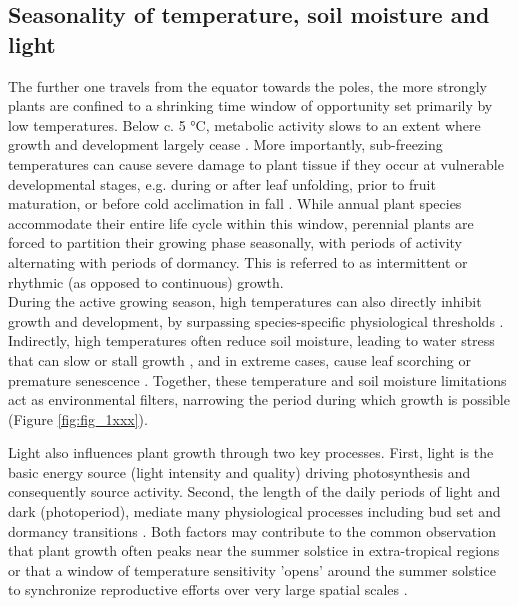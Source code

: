 \documentclass{article}
\begin{document}
	\subsection*{Seasonality of temperature, soil moisture and light}
		The further one travels from the equator towards the poles, the more strongly plants are confined to a shrinking time window of opportunity set primarily by low temperatures. Below c. 5 °C, metabolic activity slows to an extent where growth and development largely cease \citep{schenkerPhysiologicalMinimumTemperatures2014, rossiCriticalTemperaturesXylogenesis2008, kornerWinterCropGrowth2008}. More importantly, sub-freezing temperatures can cause severe damage to plant tissue if they occur at vulnerable developmental stages, e.g. during or after leaf unfolding, prior to fruit maturation, or before cold acclimation in fall \citep{sakaiFreezingInjuriesPlants1987c, baumgartenNoRiskNo2023a}. 
		While annual plant species accommodate their entire life cycle within this window, perennial plants are forced to partition their growing phase seasonally, with periods of activity alternating with periods of dormancy. This is referred to as intermittent or rhythmic (as opposed to continuous) growth. \\

		During the active growing season, high temperatures can also directly inhibit growth and development, by surpassing species-specific physiological thresholds \citep{osullivanThermalLimitsLeaf2017}. Indirectly, high temperatures often reduce soil moisture, leading to water stress that can slow or stall growth \citep{hsiaoPlantResponsesWater1973, pugnaireConstraintsWaterStress1999, etzoldNumberGrowthDays2021}, and in extreme cases, cause leaf scorching or premature senescence \citep{estiarteAlterationPhenologyLeaf2015a}. Together, these temperature and soil moisture limitations act as environmental filters, narrowing the period during which growth is possible (Figure \ref{fig:fig_1xxx}). 
		
		Light also influences plant growth through two key processes. First, light is the basic energy source (light intensity and quality) driving photosynthesis and consequently source activity. Second, the length of the daily periods of light and dark (photoperiod), mediate many physiological processes including bud set and dormancy transitions \citep{wangPlantsDistinguishDifferent2024b}. Both factors may contribute to the common observation that plant growth often peaks near the summer solstice in extra-tropical regions \citep{rossiConifersColdEnvironments2006, etzoldNumberGrowthDays2021, luoSummerSolsticeMarks2018} or that a window of temperature sensitivity 'opens’ around the summer solstice to synchronize reproductive efforts over very large spatial scales \citep{journeSummerSolsticeOrchestrates2024}.
		
\end{document}

